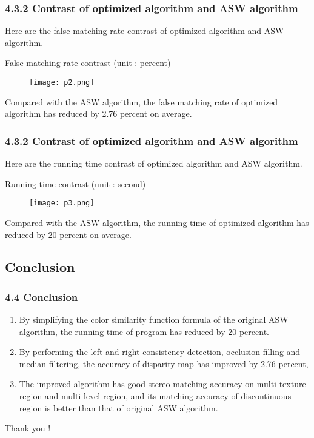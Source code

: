 \documentclass{beamer}
\begin{document}
\begin{frame}
\frametitle{4.3.2 Contrast of optimized algorithm and ASW algorithm}
Here are the false matching rate contrast of optimized algorithm and ASW algorithm.

\begin{table}
\caption{False matching rate contrast (unit : percent) }
\begin{figure}
\centering
\texttt{[image: p2.png]}
\end{figure}
\end{table}

\raggedright Compared with the ASW algorithm, the false matching rate of optimized algorithm has reduced by 2.76 percent on average.
\end{frame}

\begin{frame}
\frametitle{4.3.2 Contrast of optimized algorithm and ASW algorithm}
Here are the running time contrast of optimized algorithm and ASW algorithm.
\begin{table}
\caption{Running time contrast (unit : second)}
\begin{figure}
\centering
\texttt{[image: p3.png]}
\end{figure}

\end{table}

\raggedright Compared with the ASW algorithm, the running time of optimized algorithm has reduced by 20 percent on average.
\end{frame}

\subsection{Conclusion}
\begin{frame}
\frametitle{4.4 Conclusion}

\begin{enumerate}
\item By simplifying the color similarity function formula of the original ASW algorithm, the running time of program has reduced by 20 percent.

\item By performing the left and right consistency detection, occlusion filling and median filtering, the accuracy of disparity map has improved by 2.76 percent, 

\item The improved algorithm has good stereo matching accuracy on multi-texture region and multi-level region, and its matching accuracy of discontinuous region is better than that of original ASW algorithm.
\end{enumerate}

\end{frame}

\begin{frame}
\centering
\LARGE Thank you !
\end{frame}
\end{document}
